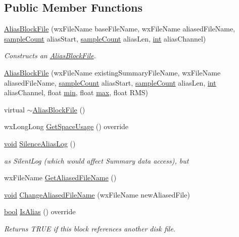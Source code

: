 \subsection*{Public Member Functions}
\begin{DoxyCompactItemize}
\item 
\hyperlink{class_alias_block_file_a6cebfd8ef018be265051795e73d871bd}{Alias\+Block\+File} (wx\+File\+Name base\+File\+Name, wx\+File\+Name aliased\+File\+Name, \hyperlink{include_2audacity_2_types_8h_afa427e1f521ea5ec12d054e8bd4d0f71}{sample\+Count} alias\+Start, \hyperlink{include_2audacity_2_types_8h_afa427e1f521ea5ec12d054e8bd4d0f71}{sample\+Count} alias\+Len, \hyperlink{xmltok_8h_a5a0d4a5641ce434f1d23533f2b2e6653}{int} alias\+Channel)
\begin{DoxyCompactList}\small\item\em Constructs an \hyperlink{class_alias_block_file}{Alias\+Block\+File}. \end{DoxyCompactList}\item 
\hyperlink{class_alias_block_file_a1951a2471e5e73492e9cbbf12a97b13d}{Alias\+Block\+File} (wx\+File\+Name existing\+Summary\+File\+Name, wx\+File\+Name aliased\+File\+Name, \hyperlink{include_2audacity_2_types_8h_afa427e1f521ea5ec12d054e8bd4d0f71}{sample\+Count} alias\+Start, \hyperlink{include_2audacity_2_types_8h_afa427e1f521ea5ec12d054e8bd4d0f71}{sample\+Count} alias\+Len, \hyperlink{xmltok_8h_a5a0d4a5641ce434f1d23533f2b2e6653}{int} alias\+Channel, float \hyperlink{_compare_audio_command_8cpp_abd8bbcfabb3ddef2ccaafb9928a37b95}{min}, float \hyperlink{_t_d_stretch_8cpp_ac39d9cef6a5e030ba8d9e11121054268}{max}, float R\+MS)
\item 
virtual \hyperlink{class_alias_block_file_a1859a5a0ff7873450ecd770e1703cdbf}{$\sim$\+Alias\+Block\+File} ()
\item 
wx\+Long\+Long \hyperlink{class_alias_block_file_afca79ab159bebe787ecbf025fe645249}{Get\+Space\+Usage} () override
\item 
\hyperlink{sound_8c_ae35f5844602719cf66324f4de2a658b3}{void} \hyperlink{class_alias_block_file_afd0f0ac721f7fe3560f1eb20b2adbb23}{Silence\+Alias\+Log} ()
\begin{DoxyCompactList}\small\item\em as Silent\+Log (which would affect Summary data access), but \end{DoxyCompactList}\item 
wx\+File\+Name \hyperlink{class_alias_block_file_a84764ec30dd1b9f1f902a1109a87d71b}{Get\+Aliased\+File\+Name} ()
\item 
\hyperlink{sound_8c_ae35f5844602719cf66324f4de2a658b3}{void} \hyperlink{class_alias_block_file_a31bb494e5380ccbcb21fb32b55d81370}{Change\+Aliased\+File\+Name} (wx\+File\+Name new\+Aliased\+File)
\item 
\hyperlink{mac_2config_2i386_2lib-src_2libsoxr_2soxr-config_8h_abb452686968e48b67397da5f97445f5b}{bool} \hyperlink{class_alias_block_file_a3a5b00b376961bc254bb421e2e7de53d}{Is\+Alias} () override
\begin{DoxyCompactList}\small\item\em Returns T\+R\+UE if this block references another disk file. \end{DoxyCompactList}\end{DoxyCompactItemize}
